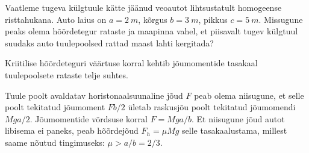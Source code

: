 
Vaatleme tugeva külgtuule kätte jäänud veoautot lihtsustatult homogeense risttahukana. Auto laius on $a = \SI{2}{m}$, kõrgus $b = \SI{3}{m}$, pikkus
$c = \SI{5}{m}$. Missugune peaks olema hõõrdetegur rataste ja maapinna vahel, et piisavalt tugev külgtuul suudaks auto tuulepoolsed rattad maast lahti kergitada?

\hint
Kriitilise hõõrdeteguri väärtuse korral kehtib jõumomentide tasakaal tuulepoolsete rataste telje suhtes.

\solu
Tuule poolt avaldatav horistonaalsuunaline jõud $F$ peab olema niisugune, et selle poolt tekitatud jõumoment $Fb/2$ ületab raskusjõu poolt tekitatud jõumomendi $Mga/2$. Jõumomentide võrdsuse korral $F=Mga/b$. Et niisugune jõud autot libisema ei paneks, peab hõõrdejõud $F_h=\mu Mg$ selle tasakaalustama, millest saame nõutud tingimuseks: $\mu > a/b = 2/3$.
\probend